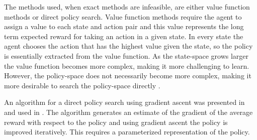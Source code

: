 The methods used, when exact methods are infeasible, are either value function methods or direct policy search. Value function methods require the agent to assign a value to each state and action pair and this value represents the long term expected reward for taking an action in a given state. In every state the agent chooses the action that has the highest value given the state, so the policy is essentially extracted from the value function. As the state-space grows larger the value function becomes more complex, making it more challenging to learn. However, the policy-space does not necessarily become more complex, making it more desirable to search the policy-space directly \cite{Aberdeen2003}. 

An algorithm for a direct policy search using gradient ascent was presented in \cite{BaxterB2001} and used in \cite{Butko2010b}. The algorithm generates an estimate of the gradient of the average reward with respect to the policy and using gradient ascent the policy is improved iteratively. This requires a parameterized representation of the policy.


